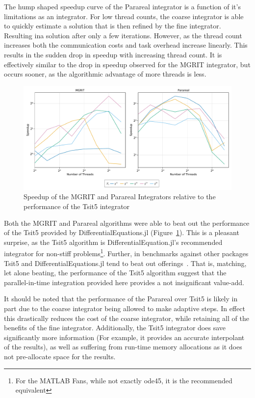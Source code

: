 \documentclass{article}
\begin{document}
The hump shaped speedup curve of the Parareal integrator is a function of it's limitations as an integrator.
For low thread counts, the coarse integrator is able to quickly estimate a solution that is then refined by the fine integrator.
Resulting ina solution after only a few iterations.
However, as the thread count increases both the communication costs and task overhead increase linearly.
This results in the sudden drop in speedup with increasing thread count.
It is effectively similar to the drop in speedup observed for the MGRIT integrator, but occurs sooner, as the algorithmic advantage of more threads is less.

\begin{figure}[h]
    \centering
    \includegraphics[width=\linewidth]{docs/assets/speedup_tsit5.pdf}
    \caption{Speedup of the MGRIT and Parareal Integrators relative to the performance of the Tsit5 integrator}
    \label{fig:heat_bench_tsit5}
\end{figure}

Both the MGRIT and Parareal algorithms were able to beat out the performance of the Tsit5 provided by DifferentialEquations.jl (Figure~\ref{fig:heat_bench_tsit5}).
This is a pleasant surprise, as the Tsit5 algorithm is DifferentialEquation.jl's recommended integrator for non-stiff problems\footnote{For the MATLAB Fans, while not exactly ode45, it is the recommended equivalent\cite{ODESolversDifferentialEquations}}.
Further, in benchmarks against other packages Tsit5 and DifferentialEquations.jl tend to beat out offerings~\cite{ODESolverMultiLanguage}.
That is, matching, let alone beating, the performance of the Tsit5 algorithm suggest that the parallel-in-time integration provided here provides a not insignificant value-add.

It should be noted that the performance of the Parareal over Tsit5 is likely in part due to the coarse integrator being allowed to make adaptive steps.
In effect this drastically reduces the cost of the coarse integrator, while retaining all of the benefits of the fine integrator.
Additionally, the Tsit5 integrator does save significantly more information (For example, it provides an accurate interpolant of the results), as well as suffering from run-time memory allocations as it does not pre-allocate space for the results.
\end{document}
